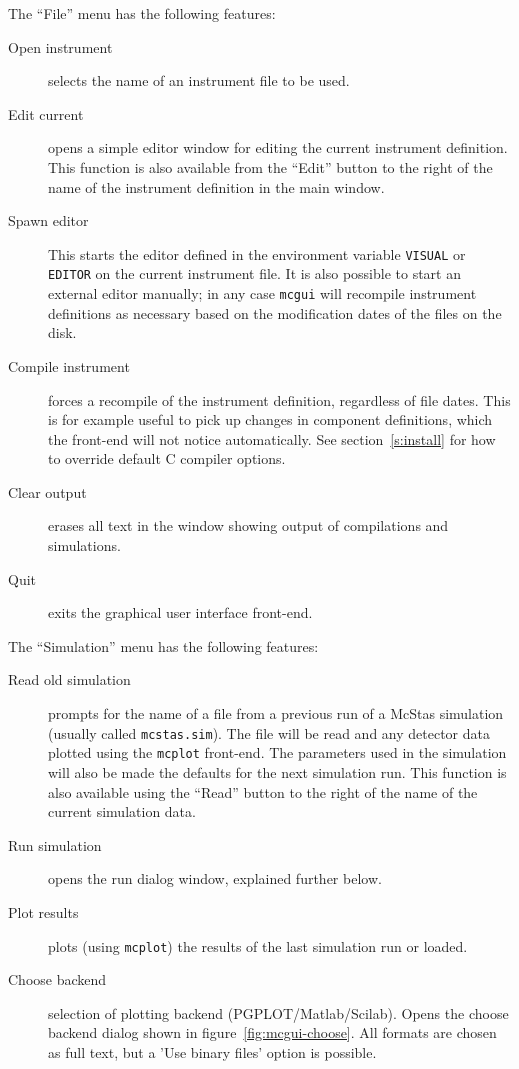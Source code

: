 The ``File'' menu has the following features:
\begin{description}
\item[Open instrument] selects the name of an instrument file to be used.
\item[Edit current] opens a simple editor window for editing the
  current instrument definition. This function is also available from
  the ``Edit'' button to the right of the name of the instrument definition in
  the main window.
\item[Spawn editor] This starts the editor defined in the environment
  variable \verb+VISUAL+ or \verb+EDITOR+ on the current instrument
  file. It is also possible to start an external editor manually; in any
  case \verb+mcgui+ will recompile instrument definitions as necessary based on
  the modification dates of the files on the disk.
\item[Compile instrument] forces a recompile of the instrument
  definition, regardless of file dates. This is for example useful to
  pick up changes in component definitions, which the front-end will not
  notice automatically. See section~\ref{s:install} for how to override
  default C compiler options.
\item[Clear output] erases all text in the window showing output of
  compilations and simulations.
\item[Quit] exits the graphical user interface front-end.
\end{description}

\noindent The ``Simulation'' menu has the following features:
\begin{description}
\item[Read old simulation] prompts for the name of a file
  from a previous run of a McStas simulation (usually called
  \verb+mcstas.sim+). The file will be read and any detector data
  plotted using the \verb+mcplot+ front-end. The parameters used in the
  simulation will also be made the defaults for the next simulation
  run. This function is also available using the ``Read'' button to the
  right of the name of the current simulation data.
\item[Run simulation] opens the run dialog window, explained
  further below.
\item[Plot results] plots (using \verb+mcplot+) the results of the
  last simulation run or loaded.
\item[Choose backend] selection of plotting backend
  (PGPLOT/Matlab/Scilab). Opens the choose backend dialog shown in
  figure~\ref{fig:mcgui-choose}. All formats are chosen as full text, but a 'Use binary files' option is possible.
\end{description}

